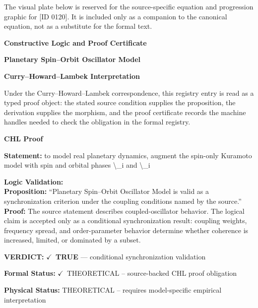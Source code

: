 \begingroup\footnotesize\sloppy
The visual plate below is reserved for the source-specific equation and progression graphic for [ID 0120]. It is included only as a companion to the canonical equation, not as a substitute for the formal text.
\par\endgroup
\ifTZPDarkEdition
{}
\fi

\clearpage
\begingroup\tzpsupportsetup
\noindent\textbf{\fontsize{10.8pt}{12.8pt}\selectfont [ID 0120] Constructive Logic and Proof Certificate}\par
\noindent\textbf{\fontsize{10pt}{12pt}\selectfont Planetary Spin--Orbit Oscillator Model}\par
\vspace{0.45em}
\begingroup
\footnotesize
\setlength{\parskip}{0.22em}
\setlength{\parindent}{0pt}
\noindent\textbf{Curry--Howard--Lambek Interpretation}\par
Under the Curry--Howard--Lambek correspondence, this registry entry is read as a typed proof
object: the stated source condition supplies the proposition, the derivation supplies the
morphism, and the proof certificate records the machine handles needed to check the obligation
in the formal registry.

\vspace{0.45em}
\noindent\textbf{CHL Proof}\par
\textbf{Statement:} to model real planetary dynamics, augment the spin-only Kuramoto model with spin and
orbital phases \textbackslash{}\_i and \textbackslash{}\_i

\textbf{Logic Validation:}\\
\textbf{Proposition:} ``Planetary Spin--Orbit Oscillator Model is valid as a synchronization criterion under the
coupling conditions named by the source.''\\
\textbf{Proof:} The source statement describes coupled-oscillator behavior. The logical claim is
accepted only as a conditional synchronization result: coupling weights, frequency
spread, and order-parameter behavior determine whether coherence is increased, limited,
or dominated by a subset.

\textbf{VERDICT:} \ensuremath{\checkmark}\ \textbf{TRUE} --- conditional synchronization validation

\textbf{Formal Status:} \ensuremath{\checkmark}\ THEORETICAL -- source-backed CHL proof obligation

\textbf{Physical Status:} THEORETICAL -- requires model-specific empirical interpretation
\par\vspace{0.45em}
\par
\ifTZPDarkEdition
{}
\fi
\endgroup
\endgroup
